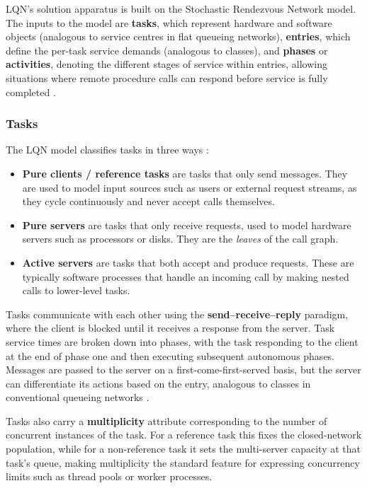 LQN's solution apparatus is built on the Stochastic Rendezvous Network model. The inputs to the model are \textbf{tasks}, which represent hardware and software objects (analogous to service centres in flat queueing networks), \textbf{entries}, which define the per-task service demands (analogous to classes), and \textbf{phases} or \textbf{activities}, denoting the different stages of service within entries, allowing situations where remote procedure calls can respond before service is fully completed \cite{franks99,franks2009}.

\subsubsection*{Tasks}

The LQN model classifies tasks in three ways \cite{franks99}:

\begin{itemize}
\item \textbf{Pure clients / reference tasks} are tasks that only send messages. They are used to model input sources such as users or external request streams, as they cycle continuously and never accept calls themselves.
\item \textbf{Pure servers} are tasks that only receive requests, used to model hardware servers such as processors or disks. They are the \textit{leaves} of the call graph.
\item \textbf{Active servers} are tasks that both accept and produce requests. These are typically software processes that handle an incoming call by making nested calls to lower-level tasks.
\end{itemize}

Tasks communicate with each other using the \textbf{send–receive–reply} paradigm, where the client is blocked until it receives a response from the server. Task service times are broken down into phases, with the task responding to the client at the end of phase one and then executing subsequent autonomous phases. Messages are passed to the server on a first-come-first-served basis, but the server can differentiate its actions based on the entry, analogous to classes in conventional queueing networks \cite{franks99}.

Tasks also carry a \textbf{multiplicity} attribute corresponding to the number of concurrent instances of the task. For a reference task this fixes the closed-network population, while for a non-reference task it sets the multi-server capacity at that task's queue, making multiplicity the standard feature for expressing concurrency limits such as thread pools or worker processes.


